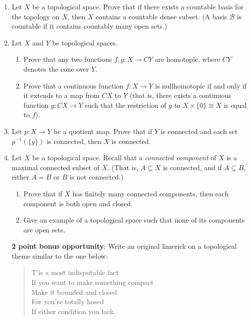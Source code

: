 \documentclass[letterpaper,12pt]{article}
\begin{document}
\begin{enumerate}
\item Let $X$ be a topological space. Prove that if there exists a countable basis for the topology on $X$, then $X$ contains a countable dense subset. (A basis $\mathcal{B}$ is countable if it contains countably many open sets.)
\newpage
\item Let $X$ and $Y$ be topological spaces.
\begin{enumerate}
\item Prove that any two functions $f,g:X\to CY$ are homotopic, where $CY$ denotes the cone over $Y$.
\item Prove that a continuous function $f:X\to Y$ is nullhomotopic if and only if it extends to a map from $CX$ to $Y$ (that is, there exists a continuous function $g:CX\to Y$ such that the restriction of $g$ to $X\times\{0\} \cong X$ is equal to $f$).
\end{enumerate}
\item Let $p:X\to Y$ be a quotient map. Prove that if $Y$ is connected and each set $p^{-1}(\{y\})$ is connected, then $X$ is connected.
\item Let $X$ be a topological space. Recall that a {\em connected component} of $X$ is a maximal connected subset of $X$. (That is, $A\subseteq X$ is connected, and if $A\subseteq B$, either $A=B$ or $B$ is not connected.)
\begin{enumerate}
\item Prove that if $X$ has finitely many connected components, then each component is both open and closed.
\item Give an example of a topological space such that none of its components are open sets. 
\end{enumerate}
{\bf 2 point bonus opportunity}: Write an original limerick on a topological theme similar to the one below:
\begin{quote}
T'is a most indisputable fact\\
If you want to make something compact\\
Make it bounded and closed\\
For you're totally hosed\\
If either condition you lack.
\end{quote}
\end{enumerate}
\end{document}
